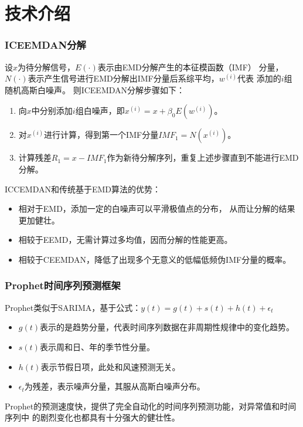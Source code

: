 \documentclass[14pt, AutoFakeBold]{ppt}
\begin{document}
\section{技术介绍}
\begin{frame}
  \frametitle{ICEEMDAN分解}
  设$x$为待分解信号，$E(·)$表示由EMD分解产生的本征模函数（IMF）
  分量，$N(·)$表示产生信号进行EMD分解出IMF分量后系综平均，$w^{(i)}$代表
  添加的$i$组随机高斯白噪声。
  则ICEEMDAN分解步骤如下：
  \begin{enumerate}
    \item 向$x$中分别添加$i$组白噪声，即$x^{(i)}=x+\beta_0E(w^{(i)})$。
    \item 对$x^{(i)}$进行计算，得到第一个IMF分量$IMF_1=N(x^{(i)})$。
    \item 计算残差$R_1=x-IMF_1$作为新待分解序列，重复上述步骤直到不能进行EMD分解。
  \end{enumerate}
  ICCEMDAN和传统基于EMD算法的优势：
  \begin{itemize}
    \item 相对于EMD，添加一定的白噪声可以平滑极值点的分布，
    从而让分解的结果更加健壮。
    \item 相较于EEMD，无需计算过多均值，因而分解的性能更高。
    \item 相较于CEEMDAN，降低了出现多个无意义的低幅低频伪IMF分量的概率。
  \end{itemize}
\end{frame}

\begin{frame}
  \frametitle{Prophet时间序列预测框架}
  Prophet类似于SARIMA，基于公式：$y(t)=g(t)+s(t)+h(t)+\epsilon_t$

  \begin{itemize}
    \item $g(t)$表示的是趋势分量，代表时间序列数据在非周期性规律中的变化趋势。
    \item $s(t)$表示周和日、年的季节性分量。
    \item $h(t)$表示节假日项，此处和风速预测无关。
    \item $\epsilon_{t}$为残差，表示噪声分量，其服从高斯白噪声分布。
  \end{itemize}
  \rightline{}
  Prophet的预测速度快，提供了完全自动化的时间序列预测功能，对异常值和时间序列中
的剧烈变化也都具有十分强大的健壮性。
\end{frame}
\end{document}
